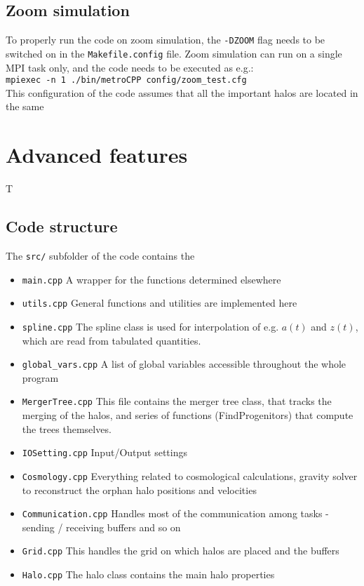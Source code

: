 \documentclass{article}
\begin{document}
\subsection{Zoom simulation}
To properly run the code on zoom simulation, the \texttt{-DZOOM} flag needs to be switched on in the \texttt{Makefile.config} file.
Zoom simulation can run on a single MPI task only, and the code needs to be executed as e.g.:\\

\texttt{mpiexec -n 1 ./bin/metroCPP config/zoom\_test.cfg}\\

This configuration of the code assumes that all the important halos are located in the same 

\section{Advanced features}
\label{sec:advanced}

T


\subsection{Code structure}
The \texttt{src/} subfolder of the code contains the

\begin{itemize}
\item{\texttt{main.cpp}} A wrapper for the functions determined elsewhere
\item{\texttt{utils.cpp}} General functions and utilities are implemented here
\item{\texttt{spline.cpp}} The spline class is used for interpolation of e.g. $a(t)$ and $z(t)$, which are
read from tabulated quantities.
\item{\texttt{global\_vars.cpp}} A list of global variables accessible throughout the whole program
\item{\texttt{MergerTree.cpp}} This file contains the merger tree class, that tracks the merging of the halos, 
and series of functions (FindProgenitors) that compute the trees themselves.
\item{\texttt{IOSetting.cpp}} Input/Output settings
\item{\texttt{Cosmology.cpp}} Everything related to cosmological calculations, gravity solver to reconstruct the orphan halo 
positions and velocities 
\item{\texttt{Communication.cpp}} Handles most of the communication among tasks - sending / receiving buffers and so on
\item{\texttt{Grid.cpp}} This handles the grid on which halos are placed and the buffers
\item{\texttt{Halo.cpp}} The halo class contains the main halo properties
\end{itemize}
\end{document}
